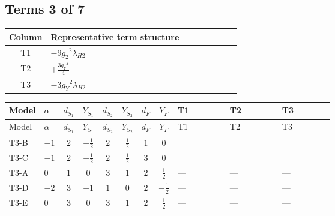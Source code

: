 \documentclass[8pt]{article}
\begin{document}
\begin{landscape}
\subsection*{Terms 3 of 7}
\begin{center}
\begin{tabular}{@{}c >{\raggedright\arraybackslash}p{0.82\linewidth}@{}}
\toprule
Column & Representative term structure \\
\midrule
T1 & \(\displaystyle -9 {g_2}^2 {\lambda_{H2}}\) \\
\midrule
T2 & \(\displaystyle +\frac{3 {g_Y}^4}{4}\) \\
\midrule
T3 & \(\displaystyle -3 {g_Y}^2 {\lambda_{H2}}\) \\
\midrule
\bottomrule
\end{tabular}
\end{center}
\smallskip
\tiny
\begin{longtable}{@{}llcccccc >{\raggedright\arraybackslash}p{0.21\linewidth} >{\raggedright\arraybackslash}p{0.21\linewidth} >{\raggedright\arraybackslash}p{0.21\linewidth}@{}}
\toprule
Model & $\alpha$ & $d_{S_1}$ & $Y_{S_1}$ & $d_{S_2}$ & $Y_{S_2}$ & $d_F$ & $Y_F$ & T1 & T2 & T3 \\
\midrule
\endfirsthead
\toprule
Model & $\alpha$ & $d_{S_1}$ & $Y_{S_1}$ & $d_{S_2}$ & $Y_{S_2}$ & $d_F$ & $Y_F$ & T1 & T2 & T3 \\
\midrule
\endhead
T3-B & $-1$ & $2$ & $-\frac{1}{2}$ & $2$ & $\frac{1}{2}$ & $1$ & $0$ & \scriptsize\adjustbox{max width=\linewidth}{$\begin{gathered} -9 {g_2}^2 {\lambda_{H2}}\end{gathered}$} & \scriptsize\adjustbox{max width=\linewidth}{$\begin{gathered} +\frac{3 {g_Y}^4}{4}\end{gathered}$} & \scriptsize\adjustbox{max width=\linewidth}{$\begin{gathered} -3 {g_Y}^2 {\lambda_{H2}}\end{gathered}$} \\
\midrule
T3-C & $-1$ & $2$ & $-\frac{1}{2}$ & $2$ & $\frac{1}{2}$ & $3$ & $0$ & \scriptsize\adjustbox{max width=\linewidth}{$\begin{gathered} -9 {g_2}^2 {\lambda_{H2}}\end{gathered}$} & \scriptsize\adjustbox{max width=\linewidth}{$\begin{gathered} +\frac{3 {g_Y}^4}{4}\end{gathered}$} & \scriptsize\adjustbox{max width=\linewidth}{$\begin{gathered} -3 {g_Y}^2 {\lambda_{H2}}\end{gathered}$} \\
\midrule
T3-A & $0$ & $1$ & $0$ & $3$ & $1$ & $2$ & $\frac{1}{2}$ & --- & --- & --- \\
\midrule
T3-D & $-2$ & $3$ & $-1$ & $1$ & $0$ & $2$ & $-\frac{1}{2}$ & --- & --- & --- \\
\midrule
T3-E & $0$ & $3$ & $0$ & $3$ & $1$ & $2$ & $\frac{1}{2}$ & --- & --- & --- \\
\midrule
\bottomrule
\end{longtable}
\clearpage

\end{landscape}
\end{document}
